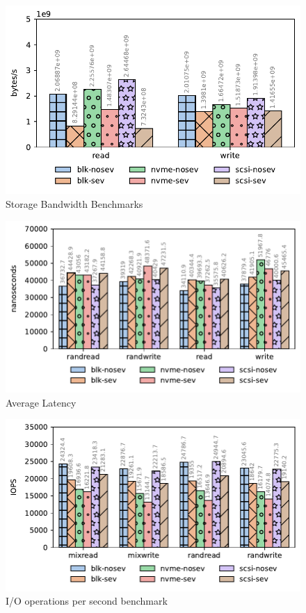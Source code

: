 \documentclass[twocolumn]{article}
\begin{document}
    \begin{figure}
        \centering
        \includegraphics[width=\columnwidth]{img/bw.pdf}
        \caption{Storage Bandwidth Benchmarks}
    \end{figure}

    \begin{figure}
        \centering
        \includegraphics[width=\columnwidth]{img/al.pdf}
        \caption{Average Latency}
    \end{figure}

    \begin{figure}
        \centering
        \includegraphics[width=\columnwidth]{img/iops.pdf}
        \caption{I/O operations per second benchmark}
    \end{figure}
\end{document}
